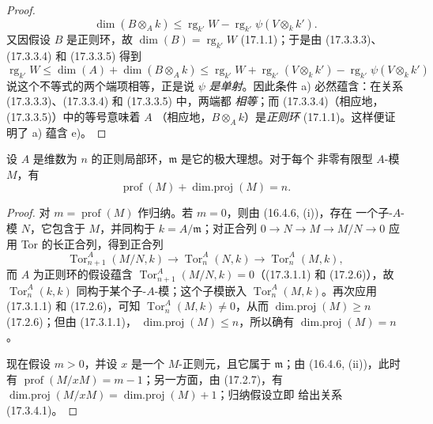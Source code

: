 \begin{proof}
\begin{equation}
\tag{17.3.3.5}
  \dim(B\otimes_A k)
  \leq\operatorname{rg}_{k'}W
  -\operatorname{rg}_{k'}\psi(V\otimes_k k').
\end{equation}
又因假设 $B$ 是正则环，故
$\dim(B)=\operatorname{rg}_{k'}W$ (17.1.1)；于是由 (17.3.3.3)、
(17.3.3.4) 和 (17.3.3.5) 得到
\[
  \operatorname{rg}_{k'}W
  \leq\dim(A)+\dim(B\otimes_A k)
  \leq\operatorname{rg}_{k'}W
  +\operatorname{rg}_{k'}(V\otimes_k k')
  -\operatorname{rg}_{k'}\psi(V\otimes_k k')
\]
说这个不等式的两个端项相等，正是说 $\psi$ \emph{是单射}。因此条件 a)
必然蕴含：在关系 (17.3.3.3)、(17.3.3.4) 和 (17.3.3.5) 中，两端都
\emph{相等}；而 (17.3.3.4)（相应地，(17.3.3.5)）中的等号意味着 $A$
（相应地，$B\otimes_A k$）是\emph{正则环} (17.1.1)。这样便证明了 a)
蕴含 e)。
\end{proof}

\begin{proposition}[17.3.4]
\label{0.17.3.4-fr}
设 $A$ 是维数为 $n$ 的正则局部环，$\mathfrak{m}$ 是它的极大理想。对于每个
非零有限型 $A$-模 $M$，有
\begin{equation}
\label{0.17.3.4.1-fr}
\tag{17.3.4.1}
  \operatorname{prof}(M)+\operatorname{dim.proj}(M)=n.
\end{equation}
\end{proposition}

\begin{proof}
对 $m=\operatorname{prof}(M)$ 作归纳。若 $m=0$，则由 (16.4.6, (i))，存在
一个子-$A$-模 $N$，它包含于 $M$，并同构于 $k=A/\mathfrak{m}$；对正合列
$0\longrightarrow N\longrightarrow M\longrightarrow M/N\longrightarrow0$
应用 Tor 的长正合列，得到正合列
\[
  \operatorname{Tor}^A_{n+1}(M/N,k)\longrightarrow
  \operatorname{Tor}^A_n(N,k)\longrightarrow
  \operatorname{Tor}^A_n(M,k),
\]
而 $A$ 为正则环的假设蕴含
$\operatorname{Tor}^A_{n+1}(M/N,k)=0$（(17.3.1.1) 和 (17.2.6)），故
$\operatorname{Tor}^A_n(k,k)$ 同构于某个子-$A$-模；这个子模嵌入
$\operatorname{Tor}^A_n(M,k)$。再次应用 (17.3.1.1) 和
(17.2.6)，可知 $\operatorname{Tor}^A_n(M,k)\neq0$，从而
$\operatorname{dim.proj}(M)\geq n$ (17.2.6)；但由 (17.3.1.1)，
$\operatorname{dim.proj}(M)\leq n$，所以确有
$\operatorname{dim.proj}(M)=n$。

现在假设 $m>0$，并设 $x$ 是一个 $M$-正则元，且它属于 $\mathfrak{m}$；由
(16.4.6, (ii))，此时有 $\operatorname{prof}(M/xM)=m-1$；另一方面，由
(17.2.7)，有
$\operatorname{dim.proj}(M/xM)=\operatorname{dim.proj}(M)+1$；归纳假设立即
给出关系 (17.3.4.1)。
\end{proof}

